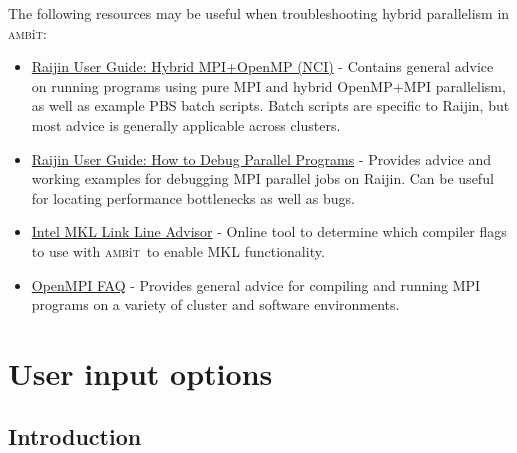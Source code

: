 \documentclass{report}
\newcommand{\ambit}{\textsc{amb}{\footnotesize i}\textsc{t}}
\begin{document}
The following resources may be useful when troubleshooting hybrid parallelism in \ambit:
\begin{itemize}
\item \href{https://opus.nci.org.au/display/Help/Hybrid+MPI+OpenMP}{Raijin User Guide: Hybrid MPI+OpenMP
(NCI)} - Contains general advice on running programs using pure MPI and hybrid OpenMP+MPI parallelism, 
as well as example PBS batch scripts. Batch scripts are specific to Raijin, but most advice is generally
applicable across clusters.

\item \href{https://opus.nci.org.au/display/Help/How+to+Debug+Parallel+Programs}{Raijin User Guide: How
to Debug Parallel Programs} - Provides advice and working examples for debugging MPI parallel jobs on
Raijin. Can be useful for locating performance bottlenecks as well as bugs.

\item \href{https://software.intel.com/en-us/articles/intel-mkl-link-line-advisor/}{Intel MKL Link Line
Advisor} - Online tool to determine which compiler flags to use with \ambit\ to enable MKL functionality.

\item \href{https://www.open-mpi.org/faq/}{OpenMPI FAQ} - Provides general advice for compiling and
running MPI programs on a variety of cluster and software environments.
\end{itemize}

\chapter{User input options}
\label{chap:input}

\section{Introduction}
\end{document}

